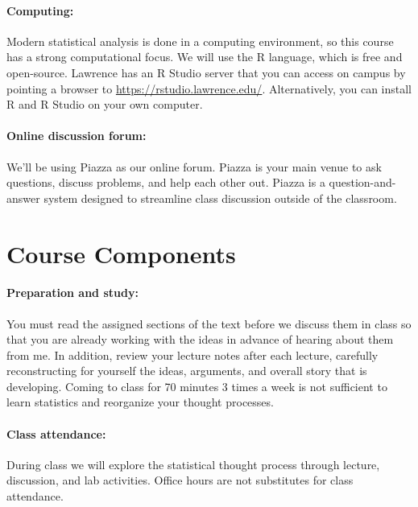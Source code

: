 \documentclass[11pt,]{article}
\begin{document}
\paragraph{Computing:}\label{computing}

Modern statistical analysis is done in a computing environment, so this
course has a strong computational focus. We will use the R language,
which is free and open-source. Lawrence has an R Studio server that you
can access on campus by pointing a browser to
\url{https://rstudio.lawrence.edu/}. Alternatively, you can install R
and R Studio on your own computer.

\paragraph{Online discussion forum:}\label{online-discussion-forum}

We'll be using Piazza as our online forum. Piazza is your main venue to
ask questions, discuss problems, and help each other out. Piazza is a
question-and-answer system designed to streamline class discussion
outside of the classroom.

\section{Course Components}\label{course-components}

\paragraph{Preparation and study:}\label{preparation-and-study}

You must read the assigned sections of the text before we discuss them
in class so that you are already working with the ideas in advance of
hearing about them from me. In addition, review your lecture notes after
each lecture, carefully reconstructing for yourself the ideas,
arguments, and overall story that is developing. Coming to class for 70
minutes 3 times a week is not sufficient to learn statistics and
reorganize your thought processes.

\paragraph{Class attendance:}\label{class-attendance}

During class we will explore the statistical thought process through
lecture, discussion, and lab activities. Office hours are not
substitutes for class attendance.
\end{document}
